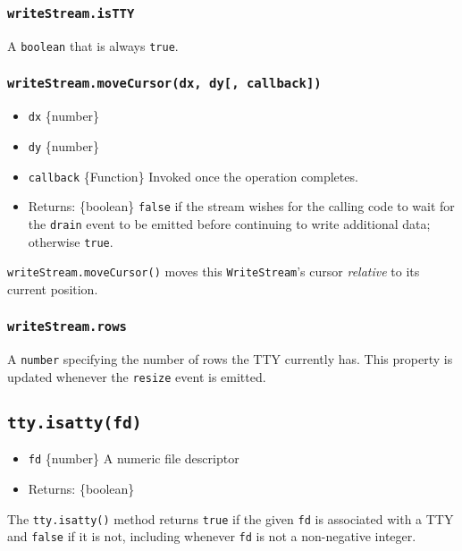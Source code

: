 \subsubsection{\texorpdfstring{\texttt{writeStream.isTTY}}{writeStream.isTTY}}\label{writestream.istty}

A \texttt{boolean} that is always \texttt{true}.

\subsubsection{\texorpdfstring{\texttt{writeStream.moveCursor(dx,\ dy{[},\ callback{]})}}{writeStream.moveCursor(dx, dy{[}, callback{]})}}\label{writestream.movecursordx-dy-callback}

\begin{itemize}
\tightlist
\item
  \texttt{dx} \{number\}
\item
  \texttt{dy} \{number\}
\item
  \texttt{callback} \{Function\} Invoked once the operation completes.
\item
  Returns: \{boolean\} \texttt{false} if the stream wishes for the
  calling code to wait for the
  \texttt{\textquotesingle{}drain\textquotesingle{}} event to be emitted
  before continuing to write additional data; otherwise \texttt{true}.
\end{itemize}

\texttt{writeStream.moveCursor()} moves this \texttt{WriteStream}'s
cursor \emph{relative} to its current position.

\subsubsection{\texorpdfstring{\texttt{writeStream.rows}}{writeStream.rows}}\label{writestream.rows}

A \texttt{number} specifying the number of rows the TTY currently has.
This property is updated whenever the
\texttt{\textquotesingle{}resize\textquotesingle{}} event is emitted.

\subsection{\texorpdfstring{\texttt{tty.isatty(fd)}}{tty.isatty(fd)}}\label{tty.isattyfd}

\begin{itemize}
\tightlist
\item
  \texttt{fd} \{number\} A numeric file descriptor
\item
  Returns: \{boolean\}
\end{itemize}

The \texttt{tty.isatty()} method returns \texttt{true} if the given
\texttt{fd} is associated with a TTY and \texttt{false} if it is not,
including whenever \texttt{fd} is not a non-negative integer.
